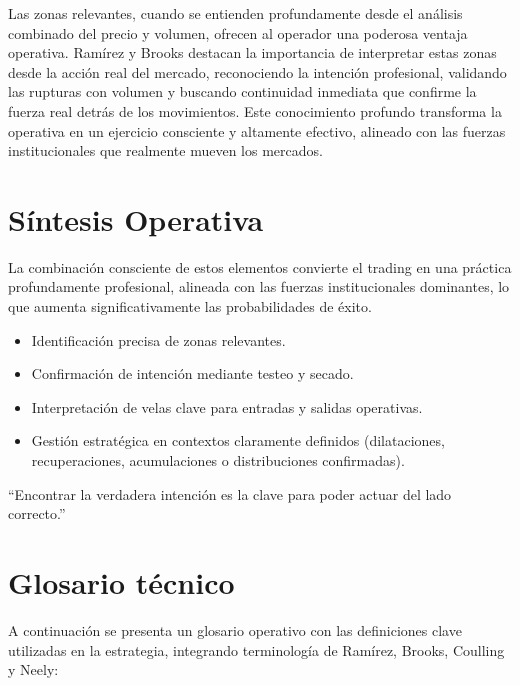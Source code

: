 Las zonas relevantes, cuando se entienden profundamente desde el an\'alisis combinado del precio y volumen, ofrecen al operador una poderosa ventaja operativa. Ram\'irez y Brooks destacan la importancia de interpretar estas zonas desde la acci\'on real del mercado, reconociendo la intenci\'on profesional, validando las rupturas con volumen y buscando continuidad inmediata que confirme la fuerza real detr\'as de los movimientos. Este conocimiento profundo transforma la operativa en un ejercicio consciente y altamente efectivo, alineado con las fuerzas institucionales que realmente mueven los mercados.

\section{S\'intesis Operativa}

La combinaci\'on consciente de estos elementos convierte el trading en una pr\'actica profundamente profesional, alineada con las fuerzas institucionales dominantes, lo que aumenta significativamente las probabilidades de \'exito.

\begin{itemize}
    \item Identificaci\'on precisa de zonas relevantes.
    \item Confirmaci\'on de intenci\'on mediante testeo y secado.
    \item Interpretaci\'on de velas clave para entradas y salidas operativas.
    \item Gesti\'on estrat\'egica en contextos claramente definidos (dilataciones, recuperaciones, acumulaciones o distribuciones confirmadas).
\end{itemize}

``Encontrar la verdadera intenci\'on es la clave para poder actuar del lado correcto.''

\section*{Glosario t\'ecnico}

\vspace{1em}

\noindent A continuaci\'on se presenta un glosario operativo con las definiciones clave utilizadas en la estrategia, integrando terminolog\'ia de Ram\'irez, Brooks, Coulling y Neely:

